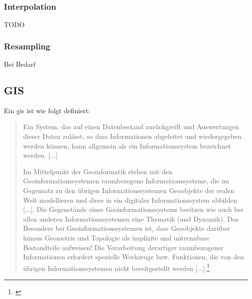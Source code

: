 \subsubsection{Interpolation}
TODO

\subsubsection{Resampling}
Bei Bedarf


\subsection{GIS}
\label{grundlagen:gis}

Ein \Gls{gis} ist wie folgt definiert:
\begin{quote}
Ein System,  das  auf einen Datenbestand zurückgreift und Auswertungen dieser Daten zulässt,  so dass Informationen abgeleitet und wiedergegeben werden können,  kann  allgemein  als  ein  Informationssystem  bezeichnet  werden. [...]

Im Mittelpunkt  der  Geoinformatik  stehen  mit den  Geoinformationssystemen raumbezogene Informationssysteme, die im Gegensatz zu den übrigen Informationssystemen Geoobjekte  der realen Welt modellieren und diese in ein digitales Informationssystem abbilden [...]. Die Gegenstände eines Geoinformationssystems  besitzen  wie  auch  bei  allen  anderen  Informationssystemen  eine 
Thematik (und Dynamik). Das Besondere bei Geoinformationssystemen ist, dass Geoobjekte darüber hinaus Geometrie und Topologie als implizite und untrennbare Bestandteile aufweisen!  Die Verarbeitung derartiger raumbezogener Informationen erfordert spezielle Werkzeuge bzw. Funktionen, die von den übrigen Informationssystemen nicht bereitgestellt werden [...].\footnote{\cite[S. 337]{book:gi-theopluspraxis3}}
\end{quote}


